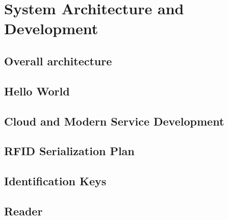 \chapter{System Architecture and Development} \label{sec:systemdevelopment}

\section{Overall architecture}

 

\section{Hello World}

\section{Cloud and Modern Service Development}

\section{RFID Serialization Plan}

\section{Identification Keys}

\section{Reader}

